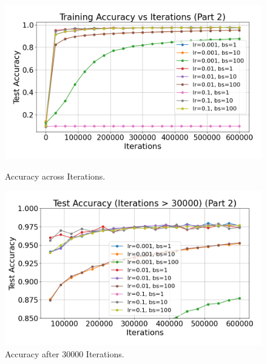\begin{figure}[h]
    \centering
    \begin{minipage}[b]{0.45\textwidth}
        \centering
        \includegraphics[width=\linewidth]{../data/part2/accuracy_training_plot}
        \caption{Accuracy across Iterations.}
        \label{fig:training}
    \end{minipage}
    \hfill
    \begin{minipage}[b]{0.45\textwidth}
        \centering
        \includegraphics[width=\linewidth]{../data/part2/accuracy_after30000}
        \caption{Accuracy after 30000 Iterations.}
        \label{fig:30000}
    \end{minipage}
\end{figure}


